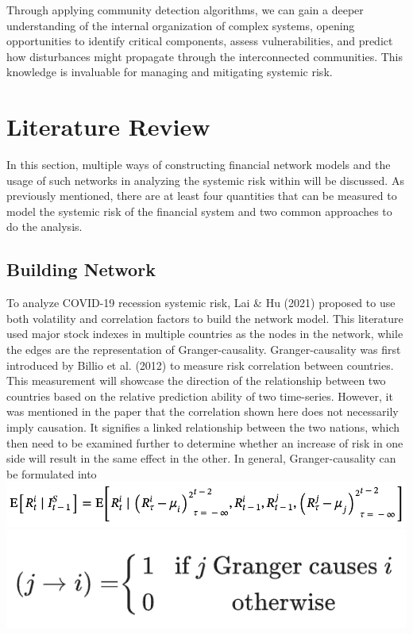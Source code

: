 \documentclass[a4paper,11pt]{article}
\begin{document}
Through applying community detection algorithms, we can gain a deeper understanding of the internal organization of complex systems, opening opportunities to identify critical components, assess vulnerabilities, and predict how disturbances might propagate through the interconnected communities. This knowledge is invaluable for managing and mitigating systemic risk.

\section{Literature Review}
In this section, multiple ways of constructing financial network models and the usage of such networks in analyzing the systemic risk within will be discussed. As previously mentioned, there are at least four quantities that can be measured to model the systemic risk of the financial system and two common approaches to do the analysis.

\subsection{Building Network}
To analyze COVID-19 recession systemic risk, Lai \& Hu (2021) proposed to use both volatility and correlation factors to build the network model. This literature used major stock indexes in multiple countries as the nodes in the network, while the edges are the representation of Granger-causality. Granger-causality was first introduced by Billio et al. (2012) to measure risk correlation between countries. This measurement will showcase the direction of the relationship between two countries based on the relative prediction ability of two time-series. However, it was mentioned in the paper that the correlation shown here does not necessarily imply causation. It signifies a linked relationship between the two nations, which then need to be examined further to determine whether an increase of risk in one side will result in the same effect in the other. In general, Granger-causality can be formulated into
\includegraphics[scale=0.5]{granger_causality_1.png}
\includegraphics[scale=0.5]{granger_causality_2.png}
\end{document}
